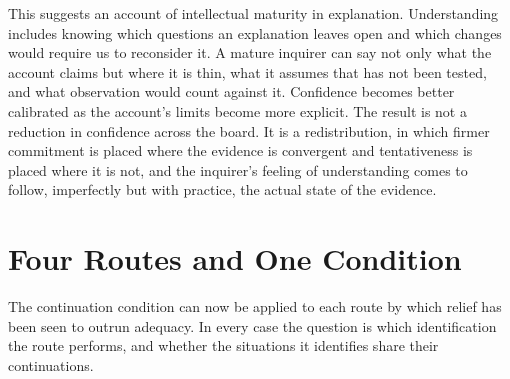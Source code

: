 \documentclass[11pt,letterpaper]{article}
\theoremstyle{definition}
\begin{document}
This suggests an account of intellectual maturity in explanation. Understanding includes knowing which questions an explanation leaves open and which changes would require us to reconsider it. A mature inquirer can say not only what the account claims but where it is thin, what it assumes that has not been tested, and what observation would count against it. Confidence becomes better calibrated as the account's limits become more explicit. The result is not a reduction in confidence across the board. It is a redistribution, in which firmer commitment is placed where the evidence is convergent and tentativeness is placed where it is not, and the inquirer's feeling of understanding comes to follow, imperfectly but with practice, the actual state of the evidence.

\section{Four Routes and One Condition}

The continuation condition can now be applied to each route by which relief has been seen to outrun adequacy. In every case the question is which identification the route performs, and whether the situations it identifies share their continuations.
\end{document}
